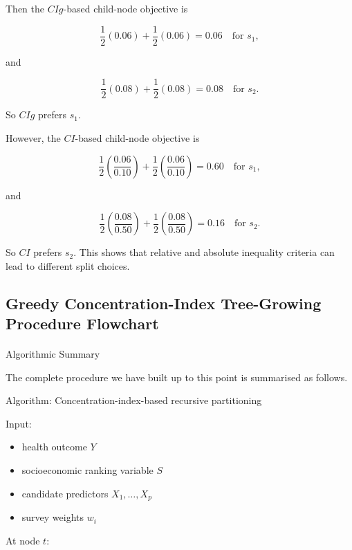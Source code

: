 \documentclass[
  11pt,
  a4paper,
]{article}
\makeatletter
\let\oldparagraph\paragraph
\renewcommand{\paragraph}{
    \@ifstar
      \xxxParagraphStar
      \xxxParagraphNoStar
  }
\newcommand{\xxxParagraphStar}[1]{\oldparagraph*{#1}\mbox{}}
\newcommand{\xxxParagraphNoStar}[1]{\oldparagraph{#1}\mbox{}}
\providecommand{\tightlist}{%
  \setlength{\itemsep}{0pt}\setlength{\parskip}{0pt}}
\makeatother
\begin{document}
Then the \(CIg\)-based child-node objective is

\[
\frac12(0.06)+\frac12(0.06)=0.06
\quad \text{for } s_1,
\]

and

\[
\frac12(0.08)+\frac12(0.08)=0.08
\quad \text{for } s_2.
\]

So \(CIg\) prefers \(s_1\).

However, the \(CI\)-based child-node objective is

\[
\frac12\left(\frac{0.06}{0.10}\right)+\frac12\left(\frac{0.06}{0.10}\right)=0.60
\quad \text{for } s_1,
\]

and

\[
\frac12\left(\frac{0.08}{0.50}\right)+\frac12\left(\frac{0.08}{0.50}\right)=0.16
\quad \text{for } s_2.
\]

So \(CI\) prefers \(s_2\). This shows that relative and absolute
inequality criteria can lead to different split choices.

\subsection{Greedy Concentration-Index Tree-Growing Procedure
Flowchart}\label{app-greedy-ci-tree-flow}

\paragraph{Algorithmic Summary}\label{algorithmic-summary}

The complete procedure we have built up to this point is summarised as
follows.

Algorithm: Concentration-index-based recursive partitioning

Input:

\begin{itemize}
\tightlist
\item
  health outcome \(Y\)
\item
  socioeconomic ranking variable \(S\)
\item
  candidate predictors \(X_1,\dots,X_p\)
\item
  survey weights \(w_i\)
\end{itemize}

At node \(t\):
\end{document}
